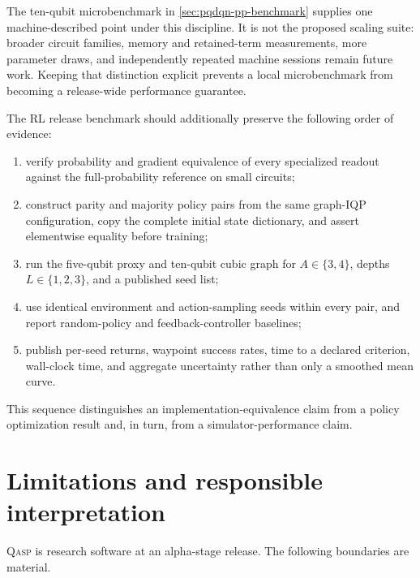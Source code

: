 \documentclass[10pt]{article}
\newcommand{\qasp}{\textsc{Qasp}}
\begin{document}
The ten-qubit microbenchmark in \cref{sec:pqdqn-pp-benchmark} supplies one
machine-described point under this discipline.  It is not the proposed scaling
suite: broader circuit families, memory and retained-term measurements, more
parameter draws, and independently repeated machine sessions remain future
work.  Keeping that distinction explicit prevents a local microbenchmark from
becoming a release-wide performance guarantee.

The RL release benchmark should additionally preserve the following order of
evidence:
\begin{enumerate}
  \item verify probability and gradient equivalence of every specialized
        readout against the full-probability reference on small circuits;
  \item construct parity and majority policy pairs from the same graph-IQP
        configuration, copy the complete initial state dictionary, and assert
        elementwise equality before training;
  \item run the five-qubit proxy and ten-qubit cubic graph for
        $A\in\{3,4\}$, depths $L\in\{1,2,3\}$, and a published seed list;
  \item use identical environment and action-sampling seeds within every pair,
        and report random-policy and feedback-controller baselines;
  \item publish per-seed returns, waypoint success rates, time to a declared
        criterion, wall-clock time, and aggregate uncertainty rather than only
        a smoothed mean curve.
\end{enumerate}
This sequence distinguishes an implementation-equivalence claim from a policy
optimization result and, in turn, from a simulator-performance claim.

\section{Limitations and responsible interpretation}
\label{sec:limitations}

\qasp{} is research software at an alpha-stage release.  The following boundaries are material.
\end{document}
